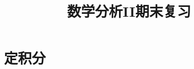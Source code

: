 \usepackage{boldline}
\everymath{\displaystyle}



\title[数分II\\
期末复习]{\texorpdfstring{\Huge \bfseries 数学分析II期末复习}{数学分析II期末复习}} %
\date{}





\begin{frame}

\titlepage %

\end{frame}




\section{定积分}

